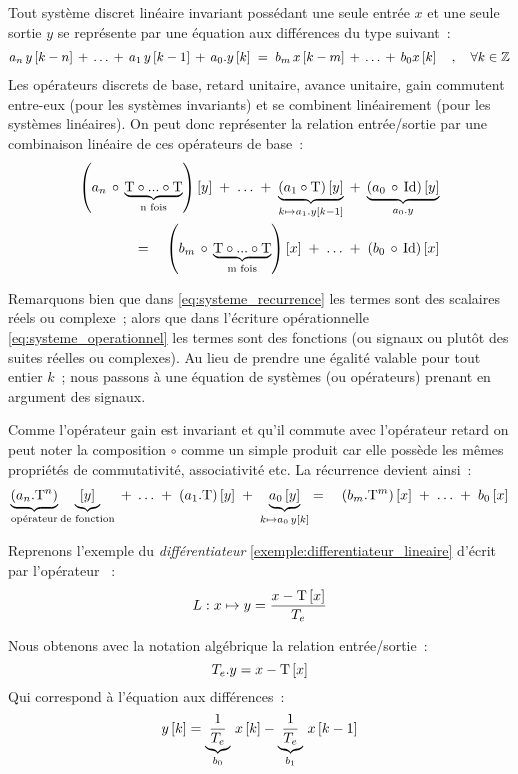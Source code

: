 Tout système discret linéaire invariant possédant une seule entrée $x$ et
une seule sortie $y$ se représente par une équation aux différences du
type suivant~:
\begin{eqnarray}
  \label{eq:systeme_recurrence}
  a_n\,y\left[k-n\right] \,+\, \ldots  \,+\,  a_1\,y\left[k-1\right] \,+\, a_0.y\left[k\right] \;=\; b_m\,x\left[k-m\right] \,+\, \ldots \,+\, b_0 x\left[k\right] \quad,\quad \forall k\in\mathbb{Z}
\end{eqnarray}
Les opérateurs discrets de base, retard unitaire, avance unitaire,
gain commutent entre-eux (pour les systèmes invariants) et se combinent
linéairement (pour les systèmes linéaires). On peut donc représenter la
relation entrée/sortie par une combinaison linéaire de ces opérateurs
de base~:
\begin{eqnarray}
  \label{eq:systeme_operationnel}
  \left(a_n\,\circ\,\underbrace{\mathrm{T}\circ...\circ \mathrm{T}}_{\text{n fois}}\right)\left[y\right]\; +\; \ldots \;+\; \underbrace{\left(a_1\circ\mathrm{T}\right)\left[y\right]}_{k\mapsto a_1.y\left[k-1\right]} \;+\; \underbrace{\left(a_0 \,\circ\, \mathrm{Id}\right)\left[y\right]}_{a_0.y} \\
  =\quad \left(b_m\,\circ\,\underbrace{\mathrm{T}\circ...\circ \mathrm{T}}_{\text{m fois}}\right)\left[x\right] \;+\; \ldots \;+\; \left(b_0 \,\circ\,\mathrm{Id}\right)\left[x\right]
\end{eqnarray}

\begin{remarque}
  Remarquons bien que dans \eqref{eq:systeme_recurrence} les termes
  sont des scalaires réels ou complexe~; alors que dans l'écriture
  opérationnelle \eqref{eq:systeme_operationnel} les termes sont des
  fonctions (ou signaux ou plutôt des suites réelles ou complexes). Au
  lieu de prendre une égalité valable pour tout entier $k$~; nous
  passons à une équation de systèmes (ou opérateurs) prenant en
  argument des signaux.
\end{remarque}


Comme l'opérateur gain est invariant et qu'il commute avec l'opérateur
retard on peut noter la composition $\circ$ comme un simple produit
car elle possède les mêmes propriétés de commutativité, associativité
etc. La récurrence devient ainsi~:
\begin{eqnarray}
 \underbrace{\left(a_n.\mathrm{T}^n\right)}_{\text{opérateur}}\underbrace{\left[y\right]}_{\text{de fonction}}\; +\; \ldots \;+\; \left(a_1.\mathrm{T}\right)\left[y\right] \;+\; \underbrace{a_0\left[y\right]}_{k\mapsto a_0\,y\left[k\right]}  = \quad \left(b_m.\mathrm{T}^m\right)\left[x\right] \;+\; \ldots \;+\; b_0\left[x\right]
\end{eqnarray}

\begin{exemple}
  Reprenons l'exemple du \emph{différentiateur} \ref{exemple:differentiateur_lineaire} d'écrit par l'opérateur ~: $$L : x \mapsto y=\frac{x-\mathrm{T}\left[x\right]}{T_e}$$
  
  Nous obtenons avec la notation algébrique la relation entrée/sortie~:
  $$
  T_e.y = x - \mathrm{T}\left[x\right]
  $$
  Qui correspond à l'équation aux différences~:
  $$
  y\left[k\right] = \underbrace{\frac{1}{T_e}}_{b_0}\,x\left[k\right]-\underbrace{\frac{1}{T_e}}_{b_1}\,x\left[k-1\right]
  $$
  
\end{exemple}

